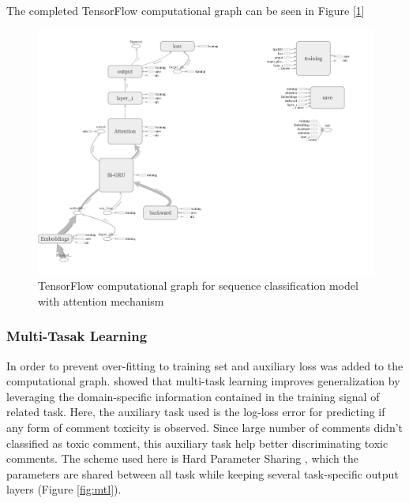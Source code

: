 \documentclass{article}
\begin{document}
    The completed TensorFlow computational graph can be seen in Figure [\ref{fig:tensorflow}]

    \begin{figure}
        \centering
        \includegraphics[scale=0.3]{tensorflow.png}
        \caption{TensorFlow computational graph for sequence classification model with attention mechanism}
        \label{fig:tensorflow}
    \end{figure}


    \subsubsection{Multi-Tasak Learning}
        In order to prevent over-fitting to training set and auxiliary loss was added to the computational graph. \cite{caruana1998multitask} showed that multi-task learning improves generalization by leveraging the domain-specific information contained in the training signal of related task. Here, the auxiliary task used is the log-loss error for predicting if any form of comment toxicity is observed. Since large number of comments didn't classified as toxic comment, this auxiliary task help better discriminating toxic comments. The scheme used here is Hard Parameter Sharing \cite{caruanamultitask}, which the parameters are shared between all task while keeping several task-specific output layers (Figure \ref{fig:mtl}).
\end{document}
